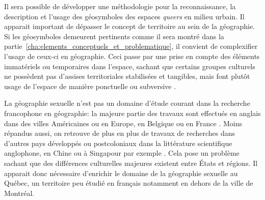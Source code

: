 Il sera possible de développer une méthodologie pour la reconnaissance, la description et l'usage des géosymboles des espaces \emph{queers} en milieu urbain.
Il apparait important de dépasser le concept de territoire au sein de la
géographie.
Si les géosymboles demeurent pertinents comme il sera montré dans la partie~\ref{cha:elements_conceptuels_et_problematique}, il convient de complexifier l'usage de ceux-ci en géographie.
Ceci passe par une prise en compte des éléments immatériels ou temporaires dans l'espace, sachant que certains groupes culturels ne possèdent pas d'assises territoriales stabilisées et tangibles, mais font plutôt usage de l'espace de manière ponctuelle ou subversive \parencite{Talburt2012}.

La géographie sexuelle n'est pas un domaine d'étude courant dans
la recherche francophone en géographie: la majeure partie des travaux sont effectués en anglais dans des villes Américaines ou en Europe, en Belgique ou en France \parencite{Blidon2010,Blidon2006,Cattan2010,Deligne2006}.
Moins répandus aussi, on retrouve de plus en plus de travaux de recherches dans d'autres pays développés ou postcoloniaux dans la littérature scientifique anglophone, en Chine ou à Singapour par exemple \parencite{Oswin2014,Kong2012}.
Cela pose un problème sachant que des différences culturelles majeures existent entre États et régions.
Il apparait donc nécessaire d'enrichir le domaine de la géographie sexuelle au Québec, un territoire peu étudié en français notamment en dehors de la ville de Montréal.
